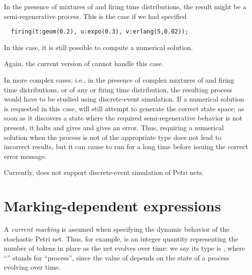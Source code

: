In the presence of mixtures of  and  firing time
distributions, the result might be a semi-regenerative process.
This is the case if we had specified
\begin{lstlisting}
  firing(t:geom(0.2), u:expo(0.3), v:erlang(5,0.02));
\end{lstlisting} 
In this case, it is still possible to compute a numerical solution.
\begin{release}
Again, the current version of \smart{} cannot handle this case.
\end{release}

In more complex cases, i.e., in the presence of complex mixtures of
 and  firing time distributions,
or of any  or  firing time distribution,
the resulting process would have to be studied using discrete-event simulation.
If a numerical solution is requested in this case, {\smart} will still
attempt to generate the correct state space;
as soon as it discovers a state where the required semi-regenerative behavior
is not present, it halts and gives and gives an error.
Thus, requiring a numerical solution when the process is not of the appropriate
type does not lead to incorrect results, but it can cause {\smart} to run for
a long time before issuing the correct error message.
\begin{release}
Currently, {\smart} does not support discrete-event simulation
of Petri nets.
\end{release}







\section{Marking-dependent expressions}
\label{SEC:spn-predefined-state-functions}

A \emph{current marking} is assumed when specifying the dynamic behavior
of the stochastic Petri net.
Thus, for example,  is an integer quantity representing
the number of tokens in place  as the net evolves over time:
we say its type is , where ``'' stands
for ``process'', since the value of  depends on the
state of a process evolving over time.

